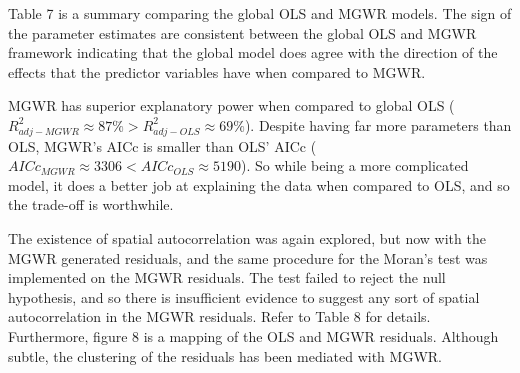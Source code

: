 \documentclass[
]{article}
\begin{document}
Table 7 is a summary comparing the global OLS and MGWR models. The sign
of the parameter estimates are consistent between the global OLS and
MGWR framework indicating that the global model does agree with the
direction of the effects that the predictor variables have when compared
to MGWR.

MGWR has superior explanatory power when compared to global OLS
(\(R_{adj-MGWR}^{2} \approx 87\% > R_{adj-OLS}^{2} \approx 69\%\)).
Despite having far more parameters than OLS, MGWR's AICc is smaller than
OLS' AICc (\(AICc_{MGWR} \approx 3306 < AICc_{OLS} \approx 5190\)). So
while being a more complicated model, it does a better job at explaining
the data when compared to OLS, and so the trade-off is worthwhile.

\newpage

The existence of spatial autocorrelation was again explored, but now
with the MGWR generated residuals, and the same procedure for the
Moran's test was implemented on the MGWR residuals. The test failed to
reject the null hypothesis, and so there is insufficient evidence to
suggest any sort of spatial autocorrelation in the MGWR residuals. Refer
to Table 8 for details. Furthermore, figure 8 is a mapping of the OLS
and MGWR residuals. Although subtle, the clustering of the residuals has
been mediated with MGWR.

\begin{table}[H]
\renewcommand{\arraystretch}{1.3} %
\setlength{\tabcolsep}{12pt} %
\centering
\caption{MGWR Residual Moran's I Test Results}
\label{tab:mgwr_morans_i}
\end{table}
\end{document}
